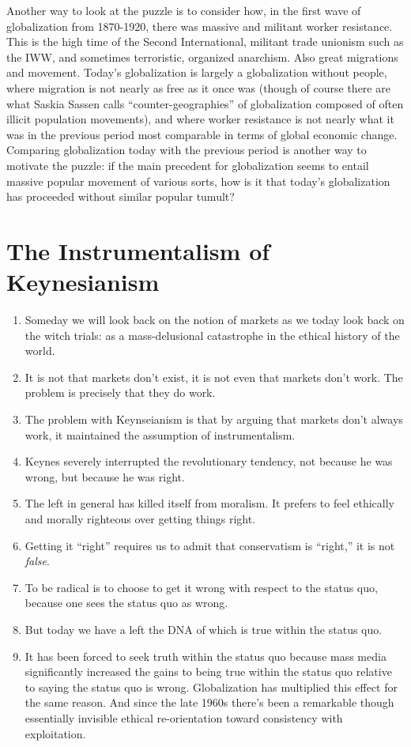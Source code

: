 \documentclass[12pt,book]{article}
\begin{document}
Another way to look at the puzzle is to consider how, in the first wave
of globalization from 1870-1920, there was massive and militant worker
resistance. This is the high time of the Second International, militant
trade unionism such as the IWW, and sometimes terroristic, organized
anarchism. Also great migrations and movement. Today's globalization is
largely a globalization without people, where migration is not nearly as
free as it once was (though of course there are what Saskia Sassen calls
``counter-geographies'' of globalization composed of often illicit
population movements), and where worker resistance is not nearly what it
was in the previous period most comparable in terms of global economic
change. Comparing globalization today with the previous period is
another way to motivate the puzzle: if the main precedent for
globalization seems to entail massive popular movement of various sorts,
how is it that today's globalization has proceeded without similar
popular tumult?

\section{The Instrumentalism of
Keynesianism}\label{the-instrumentalism-of-keynesianism}

\begin{enumerate}
\def\labelenumi{\arabic{enumi}.}
\item
  Someday we will look back on the notion of markets as we today look
  back on the witch trials: as a mass-delusional catastrophe in the
  ethical history of the world.
\item
  It is not that markets don't exist, it is not even that markets don't
  work. The problem is precisely that they do work.
\item
  The problem with Keynseianism is that by arguing that markets don't
  always work, it maintained the assumption of instrumentalism.
\item
  Keynes severely interrupted the revolutionary tendency, not because he
  was wrong, but because he was right.
\item
  The left in general has killed itself from moralism. It prefers to
  feel ethically and morally righteous over getting things right.
\item
  Getting it ``right'' requires us to admit that conservatism is
  ``right,'' it is not \emph{false}.
\item
  To be radical is to choose to get it wrong with respect to the status
  quo, because one sees the status quo as wrong.
\item
  But today we have a left the DNA of which is true within the status
  quo.
\item
  It has been forced to seek truth within the status quo because mass
  media significantly increased the gains to being true within the
  status quo relative to saying the status quo is wrong. Globalization
  has multiplied this effect for the same reason. And since the late
  1960s there's been a remarkable though essentially invisible ethical
  re-orientation toward consistency with exploitation.
\end{enumerate}
\end{document}
